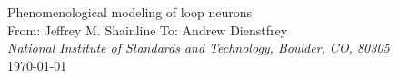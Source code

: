 \documentclass[]{article}
\begin{document}
    
\begin{center}
\LARGE{Phenomenological modeling of loop neurons}\\ 
\vspace{0.3em}
\large From: Jeffrey M. Shainline To: Andrew Dienstfrey\\
\vspace{0.0em}
\textit{\small National Institute of Standards and Technology, Boulder, CO, 80305}\\
\vspace{0.3em}
\small \today

\begin{abstract}

\vspace{1em}
\end{abstract}

\end{center}
\end{document}
